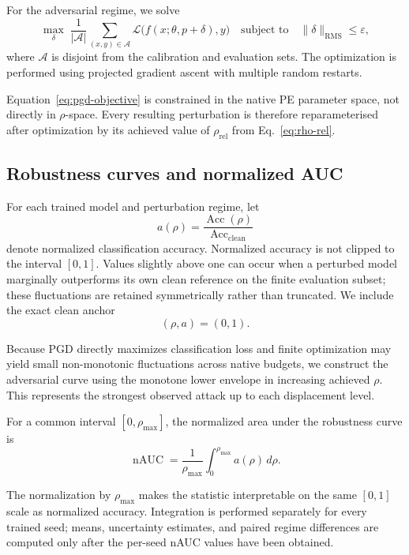 \documentclass[preprint,12pt,authoryear]{elsarticle}
\begin{document}
For the adversarial regime, we solve
\begin{equation}
\max_{\delta}
\;
\frac{1}{|\mathcal{A}|}
\sum_{(x,y)\in\mathcal{A}}
\mathcal{L}
\bigl(
f(x;\theta,p+\delta),y
\bigr)
\quad
\text{subject to}
\quad
\|\delta\|_{\mathrm{RMS}}\leq\varepsilon,
\label{eq:pgd-objective}
\end{equation}
where $\mathcal{A}$ is disjoint from the calibration and evaluation
sets. The optimization is performed using projected gradient ascent
with multiple random restarts.

Equation~\eqref{eq:pgd-objective} is constrained in the native PE
parameter space, not directly in $\rho$-space. Every resulting
perturbation is therefore reparameterised after optimization by its
achieved value of $\rho_{\mathrm{rel}}$ from
Eq.~\eqref{eq:rho-rel}.


\subsection{Robustness curves and normalized AUC}

For each trained model and perturbation regime, let
\[
a(\rho)
=
\frac{\operatorname{Acc}(\rho)}
     {\operatorname{Acc}_{\mathrm{clean}}}
\]
denote normalized classification accuracy. Normalized accuracy is not
clipped to the interval $[0,1]$. Values slightly above one can occur
when a perturbed model marginally outperforms its own clean reference
on the finite evaluation subset; these fluctuations are retained
symmetrically rather than truncated. We include the exact clean anchor
\[
(\rho,a)=(0,1).
\]

Because PGD directly maximizes classification loss and finite
optimization may yield small non-monotonic fluctuations across native
budgets, we construct the adversarial curve using the monotone lower
envelope in increasing achieved $\rho$. This represents the strongest
observed attack up to each displacement level.

For a common interval $[0,\rho_{\max}]$, the normalized area under the
robustness curve is
\begin{equation}
\operatorname{nAUC}
=
\frac{1}{\rho_{\max}}
\int_{0}^{\rho_{\max}}
a(\rho)\,d\rho.
\label{eq:nauc}
\end{equation}

The normalization by $\rho_{\max}$ makes the statistic interpretable
on the same $[0,1]$ scale as normalized accuracy. Integration is
performed separately for every trained seed; means, uncertainty
estimates, and paired regime differences are computed only after the
per-seed nAUC values have been obtained.
\end{document}
